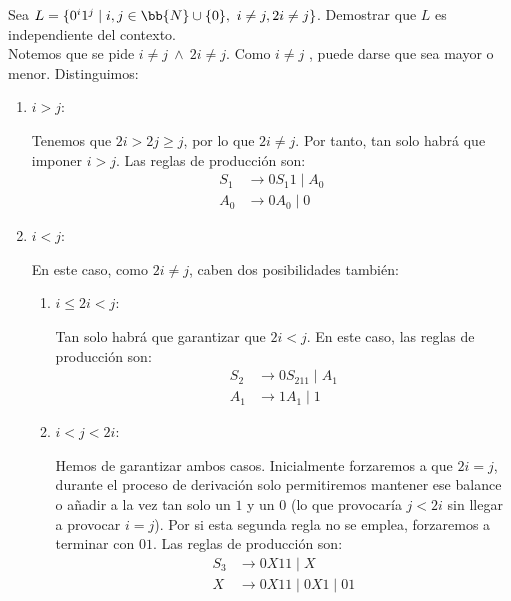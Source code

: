 \begin{ejercicio}\label{ej:1.4.21}
    Sea $L = \{ 0^i 1^j \mid i,j\in \bb{N}\cup \{0\},~i \neq j, 2i \neq j \}$. Demostrar que $L$ es independiente del contexto.\\
    
    
    Notemos que se pide $i\neq j~\land~2i\neq j$. Como $i\neq j$ , puede darse que sea mayor o menor. Distinguimos:
    \begin{enumerate}
        \item $i>j$:
        
        Tenemos que $2i>2j\geq j$, por lo que $2i\neq j$. Por tanto, tan solo habrá que imponer $i>j$.
        Las reglas de producción son:
        \begin{equation*}
            \begin{aligned}
                S_1 &\to 0S_1 1 \mid A_0\\
                A_0 &\to 0A_0 \mid 0
            \end{aligned}
        \end{equation*}

        \item $i<j$:
        
        En este caso, como $2i\neq j$, caben dos posibilidades también:
        \begin{enumerate}
            \item $i\leq 2i<j$:
            
            Tan solo habrá que garantizar que $2i<j$.
            En este caso, las reglas de producción son:
            \begin{equation*}
                \begin{aligned}
                    S_2 &\to 0S_211 \mid A_1\\
                    A_1 &\to 1A_1 \mid 1
                \end{aligned}
            \end{equation*}
            
            \item $i<j<2i$:
            
            Hemos de garantizar ambos casos.
            Inicialmente forzaremos a que $2i=j$, durante el proceso de derivación solo permitiremos mantener ese balance o añadir a la vez tan solo un $1$ y un $0$ (lo que provocaría $j<2i$ sin llegar a provocar $i=j$). Por si esta segunda regla no se emplea, forzaremos a terminar con $01$. Las reglas de producción son:
            \begin{equation*}
                \begin{aligned}
                    S_3 &\to 0X11 \mid X\\
                    X & \to 0X11 \mid 0X1 \mid 01
                \end{aligned}
            \end{equation*}            
        \end{enumerate}
    \end{enumerate}


\end{ejercicio}
